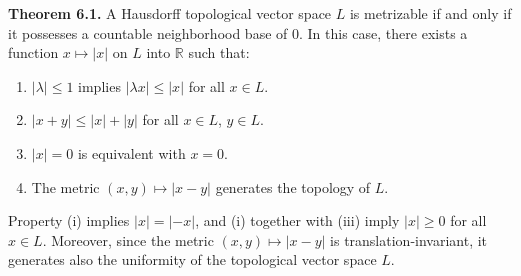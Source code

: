 \textbf{Theorem 6.1.} A Hausdorff topological vector space $L$ is metrizable if and only if it possesses a countable neighborhood base of $0$. In this case, there exists a function $x \mapsto |x|$ on $L$ into $\mathbb{R}$ such that:

\begin{enumerate}
  \item[(i)] $|\lambda| \leq 1$ implies $|\lambda x| \leq |x|$ for all $x \in L$.
  \item[(ii)] $|x + y| \leq |x| + |y|$ for all $x \in L$, $y \in L$.
  \item[(iii)] $|x| = 0$ is equivalent with $x = 0$.
  \item[(iv)] The metric $(x, y) \mapsto |x - y|$ generates the topology of $L$.
\end{enumerate}

Property (i) implies $|x| = |{-x}|$, and (i) together with (iii) imply $|x| \geq 0$ for all $x \in L$. Moreover, since the metric $(x, y) \mapsto |x - y|$ is translation-invariant, it generates also the uniformity of the topological vector space $L$.
